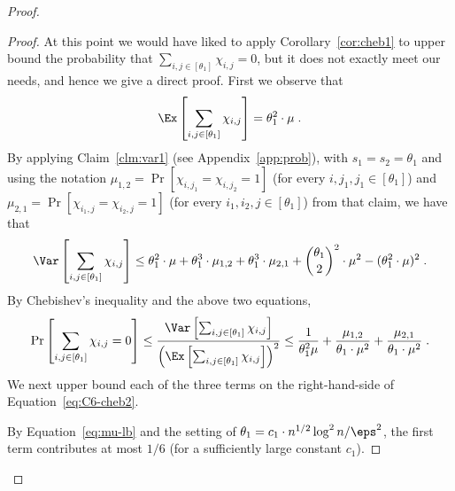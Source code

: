 \begin{proof}
\begin{proof}
At this point we would have liked to apply Corollary~\ref{cor:cheb1} to upper bound the probability that
$\sum_{i,j\in [\theta_1]} \chi_{i,j}=0$, but it does not exactly meet our needs, and hence we give a direct proof.
First we observe that 
\begin{equation}
  \Ex\left[\sum_{i,j\in [\theta_1]}\chi_{i,j}\right] = \theta_1^2\cdot \mu\;.  
\end{equation}
By applying Claim~\ref{clm:var1} (see Appendix~\ref{app:prob}), with $s_1=s_2=\theta_1$ and using the notation $\mu_{1,2} = \Pr[\chi_{i,j_1}=\chi_{i,j_2}=1]$ (for every $i,j_1,j_1\in [\theta_1]$) and
$\mu_{2,1} = \Pr[\chi_{i_1,j} = \chi_{i_2,j} = 1]$ (for every $i_1,i_2,j\in [\theta_1]$) from that claim, we have that
\begin{equation}\label{eq:var-sum-chis}
    \Var\left[\sum_{i,j\in [\theta_1]}\chi_{i,j}\right] \leq \theta_1^2\cdot \mu + \theta_1^3 \cdot \mu_{1,2} + \theta_1^3 \cdot \mu_{2,1} + {\theta_1\choose 2}^2\cdot \mu^2 - (\theta_1^2\cdot \mu)^2\;.
\end{equation}
By Chebishev's inequality and the above two equations,
\begin{equation}\label{eq:C6-cheb2}
\Pr\left[\sum_{i,j\in [\theta_1]}\chi_{i,j}=0\right] \leq \frac{\Var\left[\sum_{i,j\in [\theta_1]}\chi_{i,j}\right]}{\left(\Ex\left[\sum_{i,j\in [\theta_1]}\chi_{i,j}\right]\right)^2}
\leq  \frac{1}{\theta_1^2\mu} + \frac{\mu_{1,2}}{\theta_1\cdot \mu^2} + \frac{\mu_{2,1}}{\theta_1\cdot \mu^2} \;.
\end{equation}
We next upper bound each of the three terms on the right-hand-side of Equation~\eqref{eq:C6-cheb2}.

By Equation~\eqref{eq:mu-lb} and the setting of $\theta_1=c_1\cdot n^{1/2}\log^2 n/\eps^2$, the first term contributes at most $1/6$ (for a sufficiently large constant $c_1$). %



\end{proof}
\end{proof}
